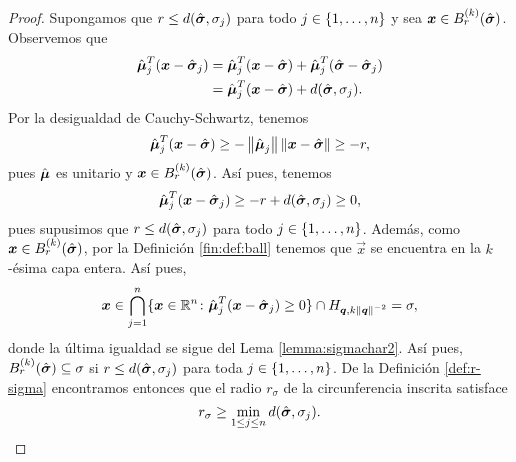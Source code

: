 \begin{proof}
	Supongamos que $r \leq d(\hat{\boldsymbol{ \sigma }}, \sigma_j)$ para todo $j \in \lbrace 1, \ldots, n \rbrace$ y sea
	$\boldsymbol{x} \in B_r^{(k)}(\hat{\boldsymbol{ \sigma }})$. Observemos que
	\begin{align*}
		\hat{\boldsymbol{\mu}}_j^T(\boldsymbol{x} - \hat{\boldsymbol{ \sigma }}_j)
		&= 
		\hat{\boldsymbol{\mu}}_j^T(\boldsymbol{x} - \hat{\boldsymbol{ \sigma }})
		+
		\hat{\boldsymbol{\mu}}_j^T(\hat{\boldsymbol{ \sigma }} - \hat{\boldsymbol{ \sigma }}_j) \\
		&=
		\hat{\boldsymbol{\mu}}_j^T(\boldsymbol{x} - \hat{\boldsymbol{ \sigma }}) + d(\hat{\boldsymbol{ \sigma }}, \sigma_j).
	\end{align*}
	Por la desigualdad de Cauchy-Schwartz, tenemos
	\begin{equation*}
		\hat{\boldsymbol{\mu}}_j^T(\boldsymbol{x} - \hat{\boldsymbol{ \sigma }}) \geq -\left\lVert \hat{\boldsymbol{\mu}}_j \right\rVert\left\lVert \boldsymbol{x} -
		\hat{\boldsymbol{ \sigma }} \right\rVert \geq -r,
	\end{equation*}
	pues $\hat{\boldsymbol{\mu}}$ es unitario y $\boldsymbol{x} \in B_r^{(k)}(\hat{\boldsymbol{ \sigma }})$. Así pues, tenemos
	\begin{equation*}
		\hat{\boldsymbol{\mu}}_j^T(\boldsymbol{x} - \hat{\boldsymbol{ \sigma }}_j) \geq -r + d(\hat{\boldsymbol{ \sigma }}, \sigma_j) \geq 0,
	\end{equation*}
	pues supusimos que $r \leq d(\hat{\boldsymbol{ \sigma }}, \sigma_j)$ para todo $j \in \lbrace 1, \ldots, n \rbrace$.
	Además, como $\boldsymbol{x} \in B_r^{(k)}(\hat{\boldsymbol{ \sigma }})$, por la Definición \ref{fin:def:ball} tenemos
	que $\vec{x}$ se encuentra en la $k$-ésima capa entera. Así pues,
	\begin{equation*}
		\boldsymbol{x} \in
		\bigcap_{j=1}^{n}
		\lbrace \boldsymbol{x} \in \mathbb{R}^n \colon \hat{\boldsymbol{\mu}}_j^T(\boldsymbol{x} - \hat{\boldsymbol{ \sigma }}_j) \geq 0 \rbrace
		\cap H_{\boldsymbol{q}, k\left\lVert \boldsymbol{q} \right\rVert^{-2}} = \sigma,
	\end{equation*}
	donde la última igualdad se sigue del Lema \ref{lemma:sigmachar2}. Así pues,
	$B_r^{(k)}(\hat{\boldsymbol{ \sigma }}) \subseteq \sigma$ si $r \leq d(\hat{\boldsymbol{ \sigma }}, \sigma_j)$ para toda $j
	\in \lbrace 1, \ldots, n \rbrace$. De la Definición \ref{def:r-sigma} encontramos entonces que el radio
	$r_\sigma$ de la circunferencia inscrita satisface
	\begin{equation}
		\label{r-sigma:down}
		r_\sigma \geq \min_{1 \leq j \leq n}d(\hat{\boldsymbol{ \sigma }}, \sigma_j).
	\end{equation}


\end{proof}
